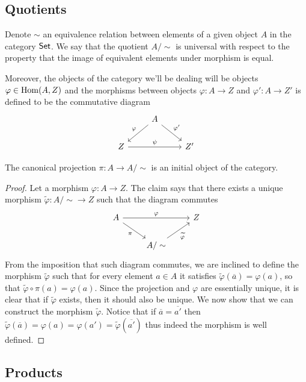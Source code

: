 \subsection{Quotients}

Denote \(\sim\) an equivalence relation between elements of a given object
\(A\) in the category \(\mathsf{Set}\). We say that the quotient \(A/\sim\) is
universal with respect to the property that the image of equivalent elements
under morphism is equal. 

Moreover, the objects of the category we'll be dealing will be objects
\(\varphi \in \operatorname{Hom}(A, Z)\) and the morphisms between objects \(\varphi : A \to
Z\) and \(\varphi' : A \to Z'\) is defined to be the commutative diagram
\[
  \begin{tikzcd}
      &A \ar[dl, swap, "\varphi"] \ar[dr, "\varphi'"] & \\
    Z \ar[rr, "\psi"] & &Z'
  \end{tikzcd}
\]

\begin{proposition}
   The canonical projection \(\pi : A \to A/\sim\) is an initial object of the
   category.
\end{proposition}

\begin{proof}
   Let a morphism \(\varphi: A \to Z\). The claim says that there exists a
   unique morphism \(\tilde{\varphi} : A/\sim \to Z\) such that the diagram
   commutes
    \[
      \begin{tikzcd}
        A \ar[rr, "\varphi"] \ar[dr, swap, "\pi"] 
          & 
            & Z \\
          & A/\sim \ar[ur, swap, "\widetilde \varphi"]
      \end{tikzcd}
   \] 
   From the imposition that such diagram commutes, we are inclined to define the
   morphism \(\tilde\varphi\) such that for every element \(a \in A\) it
   satisfies \(\tilde\varphi(\overline{a}) = \varphi(a)\), so that
   \(\tilde\varphi \circ \pi (a) = \varphi(a)\). Since the projection and
   \(\varphi\) are essentially unique, it is clear that if \(\tilde\varphi\)
   exists, then it should also be unique. We now show that we can construct the
   morphism \(\tilde\varphi\). Notice that if \(\overline{a} = \overline{a'}\) 
   then \(\tilde\varphi(\overline{a}) = \varphi(a)= \varphi(a') =
   \tilde\varphi(\overline{a'})\) thus indeed the morphism is well defined.
\end{proof}

\subsection{Products}

